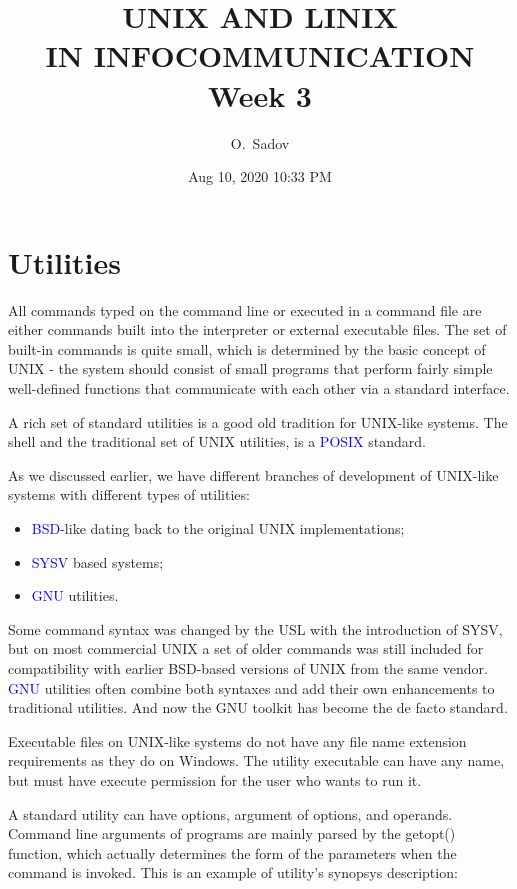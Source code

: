 \documentclass[12pt]{report}
\title%
{UNIX AND LINIX\\IN INFOCOMMUNICATION\\Week 3}
\author %
{O.~Sadov%
}
\date%
{Aug 10, 2020 10:33 PM}
\newcommand{\struct}[1]{\textcolor{blue}{#1}}
\begin{document}
\maketitle

\section*{Utilities}

All commands typed on the command line or executed in a command file are
either commands built into the interpreter or external executable files.
The set of built-in commands is quite small, which is determined by the
basic concept of UNIX - the system should consist of small programs that
perform fairly simple well-defined functions that communicate with each
other via a standard interface.

A rich set of standard utilities is a good old tradition for UNIX-like
systems. The shell and the traditional set of UNIX utilities,
is a \struct{POSIX} standard.

As we discussed earlier, we have different branches of development of UNIX-like systems with different types of utilities:
\begin{itemize}
\item \struct{BSD}-like dating back to the original UNIX implementations;
\item \struct{SYSV} based systems;
\item \struct{GNU} utilities.
\end{itemize}

Some command syntax was changed by the USL with the introduction of SYSV,
but on most commercial UNIX a set of older commands was still included
for compatibility with earlier BSD-based versions of UNIX from the same vendor.
\struct{GNU} utilities often combine both syntaxes and add their own
enhancements to traditional utilities. And now the GNU toolkit has become
the de facto standard.

Executable files on UNIX-like systems do not have any file name extension
requirements as they do on Windows. The utility executable can have any name,
but must have execute permission for the user who wants to run it.

A standard utility can have options, argument of options, and operands.
Command line arguments of programs are mainly parsed by the getopt()
function, which actually determines the form of the parameters when
the command is invoked. This is an example of utility's synopsys description:
\end{document}
